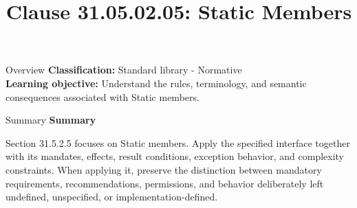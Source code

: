 \documentclass[10pt,letterpaper]{article}
\title{Clause 31.05.02.05: Static Members}
\author{}
\date{}
\begin{document}
\maketitle
\begin{CornellOverviewBox}{Overview}
\textbf{Classification:} Standard library - Normative\\[2pt]
\textbf{Learning objective:} Understand the rules, terminology, and semantic consequences associated with Static members.
\end{CornellOverviewBox}\begin{CornellSummaryBox}{Summary}
{\sffamily\bfseries\color{Accent} Summary}\par\vspace{3pt}Section 31.5.2.5 focuses on Static members. Apply the specified interface together with its mandates, effects, result conditions, exception behavior, and complexity constraints. When applying it, preserve the distinction between mandatory requirements, recommendations, permissions, and behavior deliberately left undefined, unspecified, or implementation-defined.
\end{CornellSummaryBox}
\end{document}
